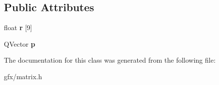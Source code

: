 \subsection*{Public Attributes}
\begin{DoxyCompactItemize}
\item 
float {\bfseries r} \mbox{[}9\mbox{]}\hypertarget{classMatrix_a08ff7b7e6b904fe4a594ce214910edbe}{}\label{classMatrix_a08ff7b7e6b904fe4a594ce214910edbe}

\item 
Q\+Vector {\bfseries p}\hypertarget{classMatrix_aafe5266a9ccca9ac336cbfabf46ac0a1}{}\label{classMatrix_aafe5266a9ccca9ac336cbfabf46ac0a1}

\end{DoxyCompactItemize}


The documentation for this class was generated from the following file\+:\begin{DoxyCompactItemize}
\item 
gfx/matrix.\+h\end{DoxyCompactItemize}
